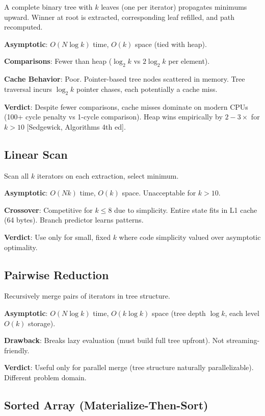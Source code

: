 \documentclass[11pt]{article}
\begin{document}
A complete binary tree with $k$ leaves (one per iterator) propagates minimums upward. Winner at root is extracted, corresponding leaf refilled, and path recomputed.

\textbf{Asymptotic}: $O(N \log k)$ time, $O(k)$ space (tied with heap).

\textbf{Comparisons}: Fewer than heap ($\log_2 k$ vs $2 \log_2 k$ per element).

\textbf{Cache Behavior}: Poor. Pointer-based tree nodes scattered in memory. Tree traversal incurs $\log_2 k$ pointer chases, each potentially a cache miss.

\textbf{Verdict}: Despite fewer comparisons, cache misses dominate on modern CPUs (100+ cycle penalty vs 1-cycle comparison). Heap wins empirically by $2-3\times$ for $k > 10$ [Sedgewick, Algorithms 4th ed].

\subsection{Linear Scan}

Scan all $k$ iterators on each extraction, select minimum.

\textbf{Asymptotic}: $O(Nk)$ time, $O(k)$ space. Unacceptable for $k > 10$.

\textbf{Crossover}: Competitive for $k \leq 8$ due to simplicity. Entire state fits in L1 cache (64 bytes). Branch predictor learns patterns.

\textbf{Verdict}: Use only for small, fixed $k$ where code simplicity valued over asymptotic optimality.

\subsection{Pairwise Reduction}

Recursively merge pairs of iterators in tree structure.

\textbf{Asymptotic}: $O(N \log k)$ time, $O(k \log k)$ space (tree depth $\log k$, each level $O(k)$ storage).

\textbf{Drawback}: Breaks lazy evaluation (must build full tree upfront). Not streaming-friendly.

\textbf{Verdict}: Useful only for parallel merge (tree structure naturally parallelizable). Different problem domain.

\subsection{Sorted Array (Materialize-Then-Sort)}
\end{document}
